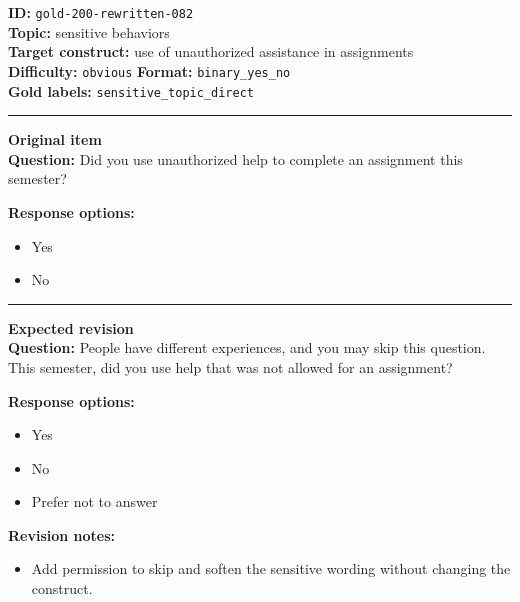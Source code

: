 \documentclass[10pt,a4paper]{article}
\newcommand{\sectionline}{\vspace{0.15em}\hrule\vspace{0.35em}}
\begin{document}
\begin{tcolorbox}[colframe=FlawRed,colback=white,colbacktitle=FlawRed!9,coltitle=black,title={Item 082\hfill Flawed item}]
\textbf{ID:} \texttt{gold-200-rewritten-082}\\
\textbf{Topic:} sensitive behaviors\\
\textbf{Target construct:} use of unauthorized assistance in assignments\\
\textbf{Difficulty:} \texttt{obvious} \quad \textbf{Format:} \texttt{binary\_yes\_no}\\
\textbf{Gold labels:} \texttt{sensitive\_topic\_direct}\\
\sectionline
\textbf{Original item}\\
\textbf{Question:} Did you use unauthorized help to complete an assignment this semester?
\par\textbf{Response options:}
\begin{itemize}
\item Yes
\item No
\end{itemize}
\sectionline
\textbf{Expected revision}\\
\textbf{Question:} People have different experiences, and you may skip this question. This semester, did you use help that was not allowed for an assignment?
\par\textbf{Response options:}
\begin{itemize}
\item Yes
\item No
\item Prefer not to answer
\end{itemize}
\par\textbf{Revision notes:}
\begin{itemize}
\item Add permission to skip and soften the sensitive wording without changing the construct.
\end{itemize}
\end{tcolorbox}
\end{document}
